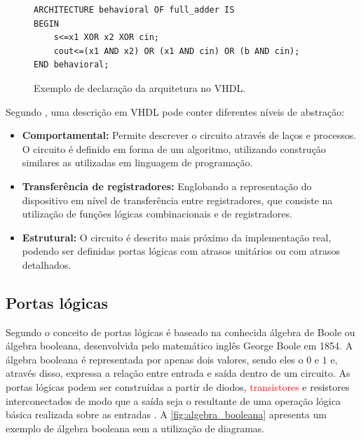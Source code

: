\begin{figure}[!htp]
\caption{\label{fig:arquitetura} Exemplo de declaração da arquitetura no VHDL.}
	\begin{center}
    \begin{minipage}{0.6\textwidth}
    \begin{lstlisting}       
ARCHITECTURE behavioral OF full_adder IS
BEGIN
	s<=x1 XOR x2 XOR cin;
    cout<=(x1 AND x2) OR (x1 AND cin) OR (b AND cin);
END behavioral;

\end{lstlisting}
    \end{minipage}
	\end{center}
\end{figure}



Segundo \cite{cappelattipraticando}, uma descrição em VHDL pode conter diferentes níveis de abstração:
\begin{itemize}
  \item \textbf{Comportamental:} Permite descrever o circuito através de laços e processos. O circuito é definido em forma de um algoritmo, utilizando construção similares as utilizadas em linguagem de programação.
  
  \item \textbf{Transferência de registradores:} Englobando a representação do dispositivo em nível de transferência entre registradores, que consiste na utilização de funções lógicas combinacionais e de registradores.
  
  \item \textbf{Estrutural:} O circuito é descrito mais próximo da implementação real, podendo ser definidas portas lógicas com atrasos unitários ou com atrasos detalhados.
\end{itemize}


\subsection{Portas lógicas}

Segundo \citeauthor{idoeta1982elementos} o conceito de portas lógicas é baseado na conhecida álgebra de Boole ou álgebra booleana, desenvolvida pelo matemático inglês George Boole em 1854. A álgebra booleana é representada por apenas dois valores, sendo eles o $0$ e $1$ e, através disso, expressa a relação entre entrada e saída dentro de um circuito. As portas lógicas podem ser construídas a partir de diodos, \textcolor{red}{transistores} e resistores interconectados de modo que a saída seja o resultante de uma operação lógica básica realizada sobre as entradas \cite{tocci2003sistemas}. A \autoref{fig:algebra_booleana} apresenta um exemplo de álgebra booleana sem a utilização de diagramas.

